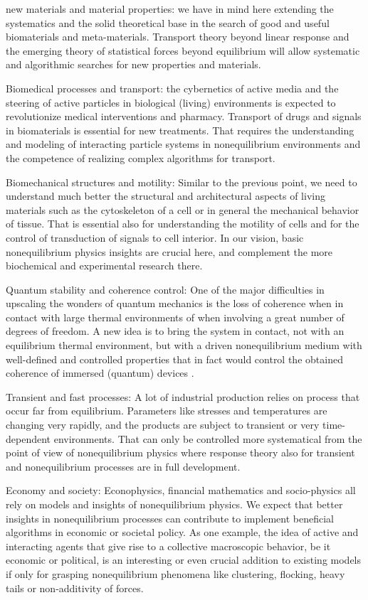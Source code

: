 \begin{compactenum}
\item new materials and material properties: we have in mind here extending the systematics and the solid theoretical base in the search of good and useful biomaterials and meta-materials.  Transport theory beyond linear response and the emerging theory of statistical forces beyond equilibrium will allow systematic and algorithmic searches for new properties and materials.
\item Biomedical processes and transport:  the cybernetics of active media and the steering of active particles in biological (living) environments is expected to revolutionize medical interventions and pharmacy.  Transport of drugs and signals in biomaterials is essential for new treatments.  That requires the understanding and modeling of interacting particle systems in nonequilibrium environments and the competence of realizing complex algorithms for transport.
\item Biomechanical structures and motility: Similar to the previous point, we need to understand much better the structural and architectural aspects of living materials such as the cytoskeleton of a cell or in general the mechanical behavior of tissue.  That is essential also for understanding the motility of cells and for the control of transduction of signals to cell interior.  In our vision, basic nonequilibrium physics insights are crucial here, and complement the more biochemical and experimental research there.
\item Quantum stability and coherence control: One of the major difficulties in upscaling the wonders of quantum mechanics is the loss of coherence when in contact with large thermal environments of when involving a great number of degrees of freedom.  A new idea is to bring the system in contact, not with an equilibrium thermal environment, but with a driven nonequilibrium medium with well-defined and controlled properties that in fact would control the obtained coherence of immersed (quantum) devices .
\item Transient and fast processes: A lot of industrial production relies on process that occur far from equilibrium.  Parameters like stresses and temperatures are changing very rapidly, and the products are subject to transient or very time-dependent environments. That can only be controlled more systematical from the point of view of nonequilibrium physics where response theory also for transient and nonequilibrium processes are in full development.
\item Economy and society:  Econophysics, financial mathematics and socio-physics all rely on models and insights of nonequilibrium physics. We expect that better insights in nonequilibrium processes can contribute to implement beneficial algorithms in economic or societal policy.  As one example, the idea of active and interacting agents that give rise to a collective macroscopic behavior, be it economic or political, is an interesting or even crucial addition to existing models if only for grasping nonequilibrium phenomena like clustering, flocking, heavy tails or non-additivity of forces.

\end{compactenum}
